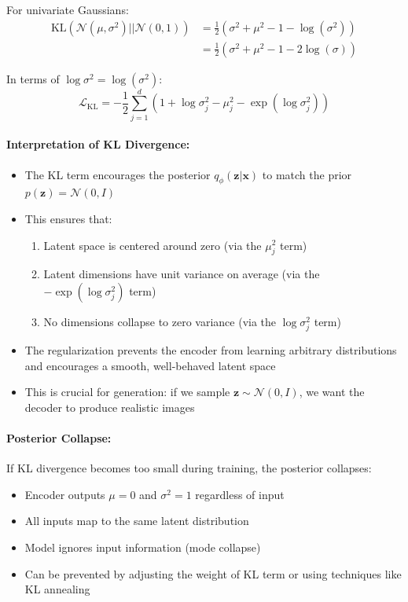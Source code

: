 \documentclass[conference]{IEEEtran}
\newcommand{\logvar}{\log \sigma^2}
\begin{document}
For univariate Gaussians:
\begin{align}
\text{KL}(\mathcal{N}(\mu, \sigma^2) || \mathcal{N}(0, 1)) &= \frac{1}{2}\left(\sigma^2 + \mu^2 - 1 - \log(\sigma^2)\right) \\
&= \frac{1}{2}\left(\sigma^2 + \mu^2 - 1 - 2\log(\sigma)\right)
\end{align}

In terms of $\logvar = \log(\sigma^2)$:
\begin{equation}
\mathcal{L}_{\text{KL}} = -\frac{1}{2} \sum_{j=1}^{d} (1 + \logvar_j - \mu_j^2 - \exp(\logvar_j))
\end{equation}

\paragraph{Interpretation of KL Divergence:}
\begin{itemize}
    \item The KL term encourages the posterior $q_\phi(\mathbf{z}|\mathbf{x})$ to match the prior $p(\mathbf{z}) = \mathcal{N}(0, I)$
    \item This ensures that:
    \begin{enumerate}
        \item Latent space is centered around zero (via the $\mu_j^2$ term)
        \item Latent dimensions have unit variance on average (via the $-\exp(\logvar_j)$ term)
        \item No dimensions collapse to zero variance (via the $\logvar_j$ term)
    \end{enumerate}
    \item The regularization prevents the encoder from learning arbitrary distributions and encourages a smooth, well-behaved latent space
    \item This is crucial for generation: if we sample $\mathbf{z} \sim \mathcal{N}(0, I)$, we want the decoder to produce realistic images
\end{itemize}

\paragraph{Posterior Collapse:}
If KL divergence becomes too small during training, the posterior collapses:
\begin{itemize}
    \item Encoder outputs $\mu = 0$ and $\sigma^2 = 1$ regardless of input
    \item All inputs map to the same latent distribution
    \item Model ignores input information (mode collapse)
    \item Can be prevented by adjusting the weight of KL term or using techniques like KL annealing
\end{itemize}
\end{document}
